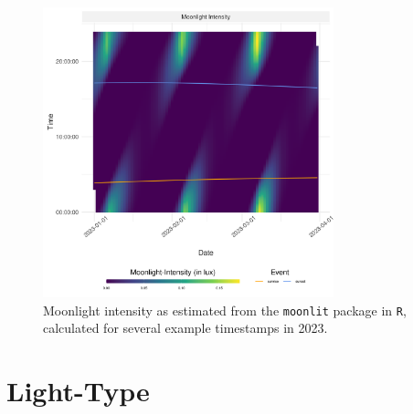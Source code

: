 \documentclass[../FinalThesis.tex]{subfiles}
\begin{document}
\begin{figure}[htpb]
 \begin{center}
  \includegraphics[width = 0.75\textwidth]{Figures/Moonlight.png}
  \caption{Moonlight intensity as estimated from the \texttt{moonlit} package
  \citep{Smielak.2023} in \texttt{R}, calculated for several example timestamps
  in 2023.}
  \label{Moonlight}
 \end{center}
\end{figure}

\newpage
\section{Light-Type}
\end{document}
